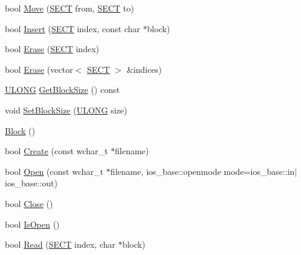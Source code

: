 \begin{DoxyCompactItemize}
\item 
bool \hyperlink{class_y_compound_files_1_1_block_acc1a8af9c35d14a7c40355c0befb320c}{Move} (\hyperlink{_basic_excel_8hpp_a784c2e2144ab372c047faeeb0f6a9e6b}{S\+E\+C\+T} from, \hyperlink{_basic_excel_8hpp_a784c2e2144ab372c047faeeb0f6a9e6b}{S\+E\+C\+T} to)
\item 
bool \hyperlink{class_y_compound_files_1_1_block_a61c12eddeb5eec41074fec564f439cf5}{Insert} (\hyperlink{_basic_excel_8hpp_a784c2e2144ab372c047faeeb0f6a9e6b}{S\+E\+C\+T} index, const char $\ast$block)
\item 
bool \hyperlink{class_y_compound_files_1_1_block_aee02b7dcfee1954b7e053ef86c24c620}{Erase} (\hyperlink{_basic_excel_8hpp_a784c2e2144ab372c047faeeb0f6a9e6b}{S\+E\+C\+T} index)
\item 
bool \hyperlink{class_y_compound_files_1_1_block_a96743e22bd59a851c9395325e99d1f7b}{Erase} (vector$<$ \hyperlink{_basic_excel_8hpp_a784c2e2144ab372c047faeeb0f6a9e6b}{S\+E\+C\+T} $>$ \&indices)
\item 
\hyperlink{_basic_excel_8hpp_abe09d1bea023be6a07cbadde8e955435}{U\+L\+O\+N\+G} \hyperlink{class_y_compound_files_1_1_block_a234785f132934f9b8737a01efbc88446}{Get\+Block\+Size} () const 
\item 
void \hyperlink{class_y_compound_files_1_1_block_a2aabdba163be99711b67402e75b961f2}{Set\+Block\+Size} (\hyperlink{_basic_excel_8hpp_abe09d1bea023be6a07cbadde8e955435}{U\+L\+O\+N\+G} size)
\item 
\hyperlink{class_y_compound_files_1_1_block_a374eb0f21a455ef899e5ed6e991a428b}{Block} ()
\item 
bool \hyperlink{class_y_compound_files_1_1_block_aee3a1b1e06f4223074a45757c98fe526}{Create} (const wchar\+\_\+t $\ast$filename)
\item 
bool \hyperlink{class_y_compound_files_1_1_block_a70d0b714b2d9702ea4c0bd57f3e8f8c8}{Open} (const wchar\+\_\+t $\ast$filename, ios\+\_\+base\+::openmode mode=ios\+\_\+base\+::in$\vert$ios\+\_\+base\+::out)
\item 
bool \hyperlink{class_y_compound_files_1_1_block_adf23374593e51d1b9d73fbce64016b51}{Close} ()
\item 
bool \hyperlink{class_y_compound_files_1_1_block_ab3cea455bdc27ee87c69ccb9ffda88c9}{Is\+Open} ()
\item 
bool \hyperlink{class_y_compound_files_1_1_block_aa0520832315f65328ef3938c48cc2e86}{Read} (\hyperlink{_basic_excel_8hpp_a784c2e2144ab372c047faeeb0f6a9e6b}{S\+E\+C\+T} index, char $\ast$block)
\item 

\end{DoxyCompactItemize}
